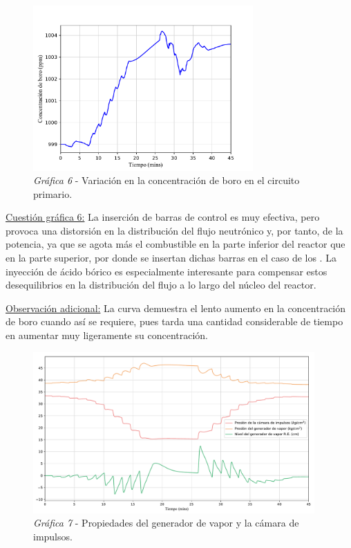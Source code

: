 \begin{figure}[h]
  \centering
  \includegraphics[width=0.75\textwidth]{content/figures/sim1_boro.pdf}
  \caption{\textit{Gráfica 6} - Variación en la concentración de boro en el circuito primario.}
  \label{fig:sim1_boro}
\end{figure}

\underline{Cuestión gráfica 6:} La inserción de barras de  control es muy efectiva, pero provoca una distorsión en la distribución del flujo neutrónico y, por tanto, de la potencia, ya que se agota más el combustible en la parte inferior del reactor que en la parte superior, por donde se insertan dichas barras en el caso de los . La inyección de ácido bórico es especialmente interesante para compensar estos desequilibrios en la distribución del flujo a lo largo del núcleo del reactor.

\underline{Observación adicional:} La curva demuestra el lento aumento en la concentración de boro cuando así se requiere, pues tarda una cantidad considerable de tiempo en aumentar muy ligeramente su concentración.

\begin{figure}[h]
  \centering
  \includegraphics[width=0.96\textwidth]{content/figures/sim1_gen_vapor_camara_imp.pdf}
  \caption{\textit{Gráfica 7} - Propiedades del generador de vapor y la cámara de impulsos.}
  \label{fig:sim1_gen_vapor_camara_imp}
\end{figure}


